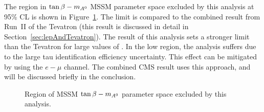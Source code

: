 The region in $\tb-\ma$ MSSM parameter space excluded by this analysis at 95\%
CL is shown in Figure~\ref{fig:TanBetaLimit}.  The limit is compared to the
combined result from \mbox{Run II} of the Tevatron (this result is discussed in
detail in Section~\ref{sec:lepAndTevatron}).  The result of this analysis sets a
stronger limit  than the Tevatron for large values of \ma.
In the low \ma region, the analysis suffers due to the large tau identification
efficiency uncertainty.  This effect can be mitigated by using the $e-\mu$
channel.  The combined CMS result uses this approach, and will be discussed
briefly in the conclusion.
\begin{figure}[htb]
  \centering
  \vspace{3in}
  \label{fig:TanBetaLimit} 
  \caption[Excluded regions of MSSM $\tb-\ma$ parameter space]{Region of MSSM
  $\tb-\ma$ parameter space excluded by this analysis.}
\end{figure}


\ifx\master\undefined\fi
